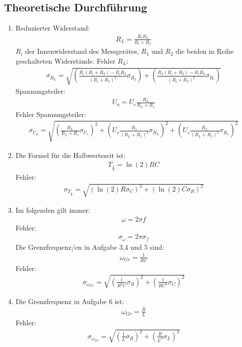 \documentclass[12pt]{scrartcl}
\begin{document}
\subsection{Theoretische Durchführung}
\begin{enumerate}
\item
Reduzierter Widerstand:
\begin{align}
R_L = \frac{R_i R_2}{R_i + R_2}
\label{eqn:para}
\end{align}
$R_i$ der Innenwiderstand des Messgerätes,
$R_1$ und $R_2$ die beiden in Reihe geschalteten Widerstände.
Fehler $R_L$:
\begin{align}
\sigma_{R_L} = \sqrt{
\left(\frac{R_i(R_i+R_2)-R_i R_2}{(R_i + R_2)^2}\sigma_{R_2}\right)+
\left(\frac{R_2(R_i+R_2)-R_i R_2}{(R_i + R_2)^2}\sigma_{R_i}\right)}
\label{eqn:para_sigma}
\end{align}
Spannungsteiler:
\begin{align}
U_a = U_e \frac{R_L}{R_L + R_1}
\label{eqn:spannungsteiler}
\end{align}
Fehler Spannungsteiler:
\begin{align}
\sigma_{U_a} = \sqrt{
\left(\frac{R_L}{R_L + R_1}\sigma_{U_e}\right)^2+
\left(U_e \frac{R_1}{(R_L + R_1)^2}\sigma_{R_L}\right)^2+
\left(U_e \frac{R_L}{(R_L + R_1)^2}\sigma_{R_1}\right)^2}
\label{eqn:spannungsteiler_sigma}
\end{align}
\item
Die Formel für die Halbwertszeit ist:
\begin{align}
T_{\frac{1}{2}} = \ln(2)RC
\label{eqn:halbzeit}
\end{align}
Fehler:
\begin{align}
\sigma_{T_{\frac{1}{2}}} = \sqrt{
\left(\ln(2)R\sigma_{C}\right)^2+
\left(\ln(2)C\sigma_{R}\right)^2}
\label{eqn:halbzeit_sigma}
\end{align}
\item
Im folgenden gilt immer:
\begin{align}
\omega = 2\pi f
\end{align}
Fehler:
\begin{align}
\sigma_{\omega} = 2\pi\sigma_f
\end{align}
Die Grenzfrequenz/en in Aufgabe 3,4 und 5 sind:
\begin{align}
\omega_{Gr} = \frac{1}{RC}
\label{eqn:omega_g}
\end{align}
Fehler:
\begin{align}
\sigma_{\omega_{Gr}} = \sqrt{
\left(\frac{1}{R^2C}\sigma_R\right)^2+
\left(\frac{1}{RC^2}\sigma_C\right)^2}
\label{eqn:omega_g_sigma}
\end{align}
\item
Die Grenzfrequenz in Aufgabe 6 ist:
\begin{align}
\omega_{Gr} = \frac{R}{L}
\end{align}
Fehler:
\begin{align}
\sigma_{\omega_{Gr}} = \sqrt{\left(\frac{1}{L}\sigma_R\right)^2+\left(\frac{R}{L^2}\sigma_L\right)^2}
\end{align}

\end{enumerate}
\end{document}
